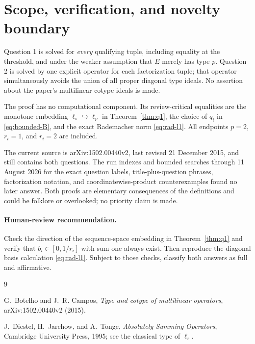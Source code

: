 \documentclass[11pt]{article}
\begin{document}
\section{Scope, verification, and novelty boundary}

Question 1 is solved for \emph{every} qualifying tuple, including equality at
the threshold, and under the weaker assumption that $E$ merely has type
$p$.  Question 2 is solved by one explicit operator for each factorization
tuple; that operator simultaneously avoids the union of all proper diagonal
type ideals.  No assertion about the paper's multilinear cotype ideals is
made.

The proof has no computational component.  Its review-critical equalities
are the monotone embedding $\ell_s\hookrightarrow\ell_p$ in
Theorem~\ref{thm:q1}, the choice of $q_i$ in
\eqref{eq:bounded-B}, and the exact Rademacher norm
\eqref{eq:rad-l1}.  All endpoints $p=2$, $r_i=1$, and $r_i=2$ are included.

The current source is arXiv:1502.00440v2, last revised 21 December 2015, and
still contains both questions.  The run indexes and bounded searches through
11 August 2026 for the exact question labels, title-plus-question phrases,
factorization notation, and coordinatewise-product counterexamples found no
later answer.  Both proofs are elementary consequences of the definitions
and could be folklore or overlooked; no priority claim is made.

\paragraph{Human-review recommendation.}
Check the direction of the sequence-space embedding in Theorem~\ref{thm:q1}
and verify that $b_i\in[0,1/r_i]$ with sum one always exist.  Then reproduce
the diagonal basis calculation \eqref{eq:rad-l1}.  Subject to those checks,
classify both answers as full and affirmative.

\begin{thebibliography}{9}

G.~Botelho and J.~R. Campos,
\emph{Type and cotype of multilinear operators},
arXiv:1502.00440v2 (2015).

J.~Diestel, H.~Jarchow, and A.~Tonge,
\emph{Absolutely Summing Operators},
Cambridge University Press, 1995; see the classical type of $\ell_r$.

\end{thebibliography}
\end{document}

